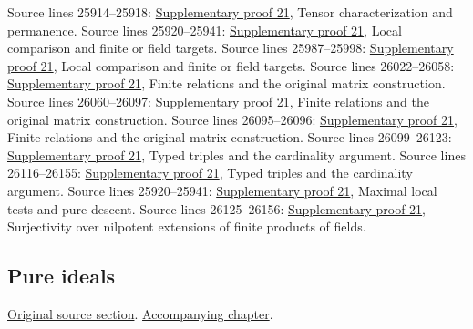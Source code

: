 \begin{AlgebraSourceRoutes}
 Source lines 25914--25918: \hyperlink{algebra_epimorphism_notes_20260928}{Supplementary proof 21}, Tensor characterization and permanence.
 Source lines 25920--25941: \hyperlink{algebra_epimorphism_notes_20260928}{Supplementary proof 21}, Local comparison and finite or field targets.
 Source lines 25987--25998: \hyperlink{algebra_epimorphism_notes_20260928}{Supplementary proof 21}, Local comparison and finite or field targets.
 Source lines 26022--26058: \hyperlink{algebra_epimorphism_notes_20260928}{Supplementary proof 21}, Finite relations and the original matrix construction.
 Source lines 26060--26097: \hyperlink{algebra_epimorphism_notes_20260928}{Supplementary proof 21}, Finite relations and the original matrix construction.
 Source lines 26095--26096: \hyperlink{algebra_epimorphism_notes_20260928}{Supplementary proof 21}, Finite relations and the original matrix construction.
 Source lines 26099--26123: \hyperlink{algebra_epimorphism_notes_20260928}{Supplementary proof 21}, Typed triples and the cardinality argument.
 Source lines 26116--26155: \hyperlink{algebra_epimorphism_notes_20260928}{Supplementary proof 21}, Typed triples and the cardinality argument.
 Source lines 25920--25941: \hyperlink{algebra_epimorphism_notes_20260928}{Supplementary proof 21}, Maximal local tests and pure descent.
 Source lines 26125--26156: \hyperlink{algebra_epimorphism_notes_20260928}{Supplementary proof 21}, Surjectivity over nilpotent extensions of finite products of fields.
\end{AlgebraSourceRoutes}

\subsection{Pure ideals}
\hypertarget{algebra-source-section-pure-ideals}{}
\noindent\href{https://github.com/stacks/stacks-project/blob/a04446e57ec1fbc252a871afcec7752fb2807b14/algebra.tex\#L26192}{Original source section}. \href{algebra.pdf\#nameddest=section-pure-ideals}{Accompanying chapter}.

